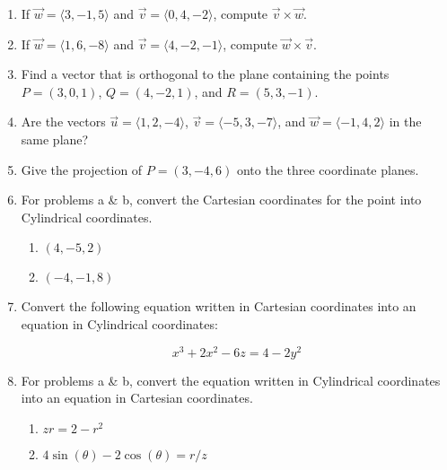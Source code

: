\documentclass[11pt]{article}
\begin{document}
\begin{enumerate}
    \item If \( \vec{w} = \langle 3, -1, 5 \rangle \) and \( \vec{v} = \langle 0, 4, -2 \rangle \), compute \( \vec{v} \times \vec{w} \).
    
    \item If \( \vec{w} = \langle 1, 6, -8 \rangle \) and \( \vec{v} = \langle 4, -2, -1 \rangle \), compute \( \vec{w} \times \vec{v} \).
    
    \item Find a vector that is orthogonal to the plane containing the points \( P = (3, 0, 1) \), \( Q = (4, -2, 1) \), and \( R = (5, 3, -1) \).
    
    \item Are the vectors \( \vec{u} = \langle 1, 2, -4 \rangle \), \( \vec{v} = \langle -5, 3, -7 \rangle \), and \( \vec{w} = \langle -1, 4, 2 \rangle \) in the same plane?

    \item Give the projection of \( P = (3, -4, 6) \) onto the three coordinate planes.

    \item For problems a \& b, convert the Cartesian coordinates for the point into Cylindrical coordinates.

    \begin{enumerate}
            \item \( (4, -5, 2) \)
    
            \item \( (-4, -1, 8) \)
    \end{enumerate}

    \item Convert the following equation written in Cartesian coordinates into an equation in Cylindrical coordinates:

\[
x^3 + 2x^2 - 6z = 4 - 2y^2
\]
    \item For problems a \& b, convert the equation written in Cylindrical coordinates into an equation in Cartesian coordinates.

    \begin{enumerate}
    
        \item \( z r = 2 - r^2 \)
    
        \item \( 4 \sin(\theta) - 2 \cos(\theta) = r/ z \)
    \end{enumerate}






\end{enumerate}
\end{document}
